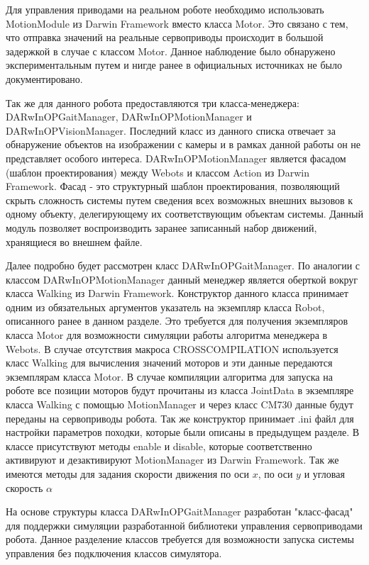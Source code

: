 Для управления приводами на реальном роботе необходимо использовать MotionModule из Darwin Framework вместо класса Motor. Это связано с тем, что отправка значений на реальные сервоприводы происходит в большой задержкой в случае с классом Motor. Данное наблюдение было обнаружено экспериментальным путем и нигде ранее в официальных источниках не было документировано.

Так же для данного робота предоставляются три класса-менеджера: DARwInOPGaitManager, DARwInOPMotionManager и DARwInOPVisionManager. Последний класс из данного списка отвечает за обнаружение объектов на изображении с камеры и в рамках данной работы он не представляет особого интереса. DARwInOPMotionManager является фасадом (шаблон проектирования) между Webots и классом Action из Darwin Framework. Фасад - это структурный шаблон проектирования, позволяющий скрыть сложность системы путем сведения всех возможных внешних вызовов к одному объекту, делегирующему их соответствующим объектам системы. Данный модуль позволяет воспроизводить заранее записанный набор движений, хранящиеся во внешнем файле.

Далее подробно будет рассмотрен класс DARwInOPGaitManager. По аналогии с классом DARwInOPMotionManager данный менеджер является оберткой вокруг класса Walking из Darwin Framework. Конструктор данного класса принимает одним из обязательных аргументов указатель на экземпляр класса Robot, описанного ранее в данном разделе. Это требуется для получения экземпляров класса Motor для возможности симуляции работы алгоритма менеджера в Webots. В случае отсутствия макроса CROSSCOMPILATION используется класс Walking для вычисления значений моторов и эти данные передаются экземплярам класса Motor. В случае компиляции алгоритма для запуска на роботе все позиции моторов будут прочитаны из класса JointData в экземпляре класса Walking с помощью MotionManager и через класс CM730 данные будут переданы на сервоприводы робота. Так же конструктор принимает \*.ini файл для настройки параметров походки, которые были описаны в предыдущем разделе. В классе присутствуют методы enable и disable, которые соответственно активируют и дезактивируют MotionManager из Darwin Framework. Так же имеются методы для задания скорости движения по оси $x$, по оси $y$ и угловая скорость $\alpha$

На основе структуры класса DARwInOPGaitManager разработан "класс-фасад" для поддержки симуляции разработанной библиотеки управления сервоприводами робота. Данное разделение классов требуется для возможности запуска системы управления без подключения классов симулятора.

